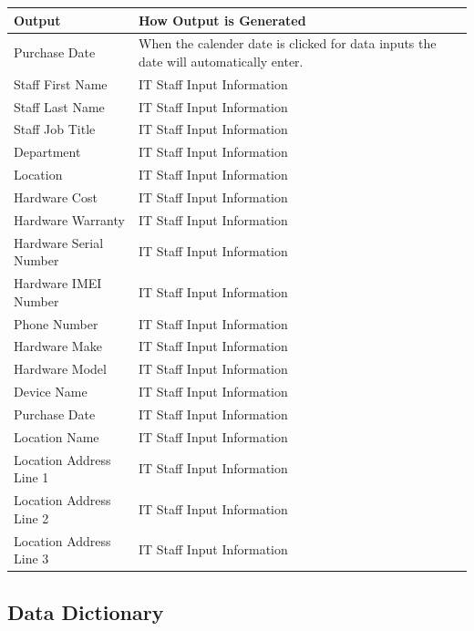 \begin{center}
    \begin{tabular}{|p{5cm}|p{5cm}|}
        \hline
        \textbf{Output} & \textbf{How Output is Generated}\\ \hline
	Purchase Date & When the calender date is clicked for data inputs the date will automatically enter.\\ \hline
	Staff First Name & IT Staff Input Information \\ \hline
	Staff Last Name & IT Staff Input Information \\ \hline
	Staff Job Title & IT Staff Input Information \\ \hline
	Department & IT Staff Input Information \\ \hline
	Location & IT Staff Input Information \\ \hline
	Hardware Cost & IT Staff Input Information \\ \hline
	Hardware Warranty & IT Staff Input Information \\ \hline
	Hardware Serial Number & IT Staff Input Information \\ \hline
	Hardware IMEI Number & IT Staff Input Information \\ \hline
	Phone Number & IT Staff Input Information \\ \hline
	Hardware Make & IT Staff Input Information \\ \hline
	Hardware Model & IT Staff Input Information \\ \hline
	Device Name & IT Staff Input Information \\ \hline
	Purchase Date & IT Staff Input Information \\ \hline
	Location Name & IT Staff Input Information \\ \hline
	Location Address Line 1 & IT Staff Input Information \\ \hline
	Location Address Line 2 & IT Staff Input Information \\ \hline
	Location Address Line 3 & IT Staff Input Information \\ \hline
    \end{tabular}
\end{center}

\newpage

\subsection{Data Dictionary}

